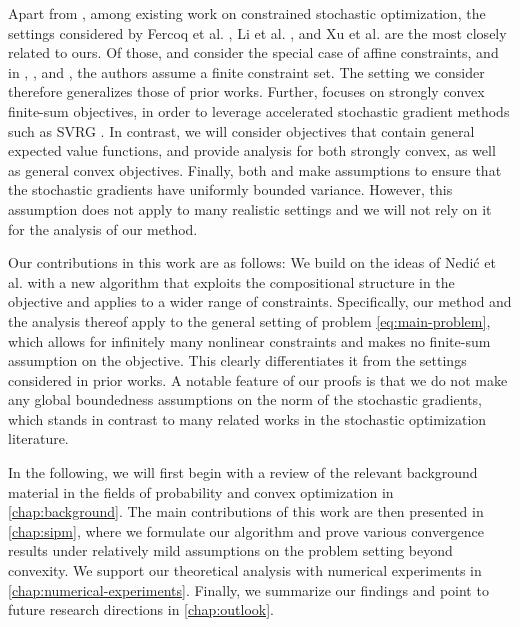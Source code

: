 Apart from \cite{nedich2023huber},
among existing work on constrained stochastic optimization,
the settings considered by Fercoq et al. \cite{fercoq2019almost},
Li et al. \cite{li2023softplus}, and Xu et al. \cite{xu2020primal}
are the most closely related to ours.
Of those, \cite{fercoq2019almost} and \cite{nedich2023huber} consider
the special case of affine constraints, and in \cite{xu2020primal},
\cite{nedich2023huber}, and \cite{li2023softplus}, the authors
assume a finite constraint set. The setting we consider therefore generalizes those of prior works.
Further, \cite{li2023softplus} focuses on strongly convex finite-sum objectives, in order
to leverage accelerated stochastic gradient methods such as SVRG \cite{johnson2013svrg}.
In contrast, we will consider objectives that contain general expected value functions,
and provide analysis for both strongly convex, as well as general convex objectives.
Finally, both \cite{fercoq2019almost} and \cite{xu2020primal}
make assumptions to ensure that the stochastic
gradients have uniformly bounded variance. However, this assumption does not apply to many
realistic settings \cite{nguyen2018sgd} and we will not rely on it for the
analysis of our method.

Our contributions in this work are as follows:
We build on the ideas of Nedić et al. \cite{nedich2023huber} with a new
algorithm that exploits the compositional structure in the objective and
applies to a wider range of constraints.
Specifically, our method and the analysis thereof apply to the
general setting of problem \eqref{eq:main-problem},
which allows for infinitely many nonlinear constraints and
makes no finite-sum assumption on the objective. This clearly differentiates
it from the settings considered in prior works.
A notable feature of our proofs is that we do not make any global boundedness assumptions on the norm
of the stochastic gradients, which stands in contrast to many related works in the stochastic optimization
literature.

In the following, we will first begin with a review of the relevant background material in the
fields of probability and convex optimization in \cref{chap:background}.
The main contributions of this work
are then presented in \cref{chap:sipm}, where we formulate our algorithm
and prove various convergence results under relatively mild assumptions on the problem setting beyond convexity.
We support our theoretical analysis with numerical experiments in \cref{chap:numerical-experiments}.
Finally, we summarize our findings and point to future research directions in \cref{chap:outlook}.